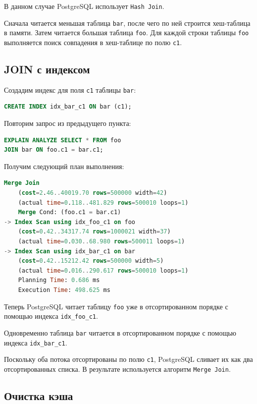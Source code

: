 \documentclass{bmstu-sob}
\begin{document}
	
	В данном случае PostgreSQL использует \texttt{Hash Join}.
	
	Сначала читается меньшая таблица \texttt{bar}, после чего по ней строится хеш-таблица в памяти.
	Затем читается большая таблица \texttt{foo}.
	Для каждой строки таблицы \texttt{foo} выполняется поиск совпадения в хеш-таблице по полю \texttt{c1}.
	
	\subsection{JOIN с индексом}
	
	Создадим индекс для поля \texttt{c1} таблицы \texttt{bar}:
	
	\begin{lstlisting}[language=SQL]
CREATE INDEX idx_bar_c1 ON bar (c1);
	\end{lstlisting}
	
	
	Повторим запрос из предыдущего пункта:
	
	\begin{lstlisting}[language=SQL]
	EXPLAIN ANALYZE SELECT * FROM foo
JOIN bar ON foo.c1 = bar.c1;
	\end{lstlisting}
	
	
	Получим следующий план выполнения:
	
	\begin{lstlisting}[language=SQL]
	Merge Join
	(cost=2.46..40019.70 rows=500000 width=42)
	(actual time=0.118..481.829 rows=500010 loops=1)
	Merge Cond: (foo.c1 = bar.c1)
-> Index Scan using idx_foo_c1 on foo
	(cost=0.42..34317.74 rows=1000021 width=37)
	(actual time=0.030..68.980 rows=500011 loops=1)
-> Index Scan using idx_bar_c1 on bar
	(cost=0.42..15212.42 rows=500000 width=5)
	(actual time=0.016..290.617 rows=500010 loops=1)	
	Planning Time: 0.686 ms
	Execution Time: 498.625 ms
	\end{lstlisting}
	
	
	Теперь PostgreSQL читает таблицу \texttt{foo} уже в отсортированном порядке
	с помощью индекса \texttt{idx\_foo\_c1}.
	
	Одновременно таблица \texttt{bar} читается в отсортированном порядке
	с помощью индекса \texttt{idx\_bar\_c1}.
	
	Поскольку оба потока отсортированы по полю \texttt{c1}, PostgreSQL
	сливает их как два отсортированных списка. В результате используется
	алгоритм \texttt{Merge Join}.
	
	\subsection{Очистка кэша}
	
\end{document}
